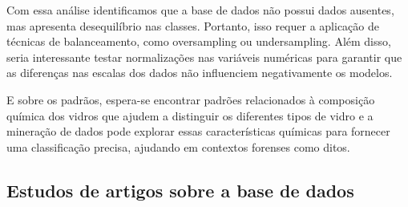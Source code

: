 \documentclass[
]{article}
\begin{document}
Com essa análise identificamos que a base de dados não possui dados
ausentes, mas apresenta desequilíbrio nas classes. Portanto, isso requer
a aplicação de técnicas de balanceamento, como oversampling ou
undersampling. Além disso, seria interessante testar normalizações nas
variáveis numéricas para garantir que as diferenças nas escalas dos
dados não influenciem negativamente os modelos.

E sobre os padrãos, espera-se encontrar padrões relacionados à
composição química dos vidros que ajudem a distinguir os diferentes
tipos de vidro e a mineração de dados pode explorar essas
características químicas para fornecer uma classificação precisa,
ajudando em contextos forenses como ditos.

\subsection{\texorpdfstring{Estudos de artigos sobre a base de dados
}{Estudos de artigos sobre a base de dados }}\label{estudos-de-artigos-sobre-a-base-de-dados}
\end{document}
